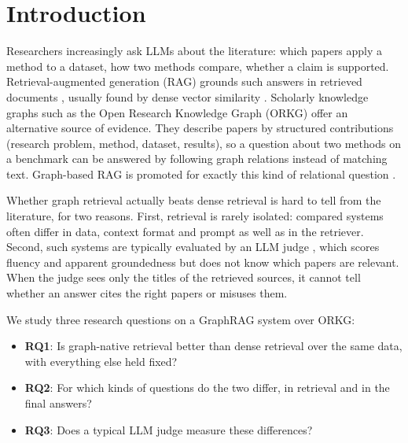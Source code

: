 
\section{Introduction}
\label{sec:intro}

Researchers increasingly ask LLMs about the literature: which papers apply a
method to a dataset, how two methods compare, whether a claim is supported.
Retrieval-augmented generation (RAG) grounds such answers in retrieved
documents \cite{lewis2020rag}, usually found by dense vector similarity
\cite{karpukhin2020dpr}. Scholarly knowledge graphs such as the Open Research
Knowledge Graph (ORKG) \cite{jaradeh2019orkg} offer an alternative source of
evidence. They describe papers by structured contributions (research problem,
method, dataset, results), so a question about two methods on a benchmark can
be answered by following graph relations instead of matching text. Graph-based
RAG is promoted for exactly this kind of relational question
\cite{peng2024graphragsurvey}.

Whether graph retrieval actually beats dense retrieval is hard to tell from
the literature, for two reasons. First, retrieval is rarely isolated: compared
systems often differ in data, context format and prompt as well as in the
retriever. Second, such systems are typically evaluated by an LLM
judge \cite{liu2023geval}, which scores fluency and apparent groundedness but
does not know which papers are relevant. When the judge sees only the titles
of the retrieved sources, it cannot tell whether an answer cites the right
papers or misuses them.

We study three research questions on a GraphRAG system over ORKG:
\begin{itemize}
\item \textbf{RQ1}: Is graph-native retrieval better than dense retrieval over
  the same data, with everything else held fixed?
\item \textbf{RQ2}: For which kinds of questions do the two differ, in
  retrieval and in the final answers?
\item \textbf{RQ3}: Does a typical LLM judge measure these differences?
\end{itemize}

